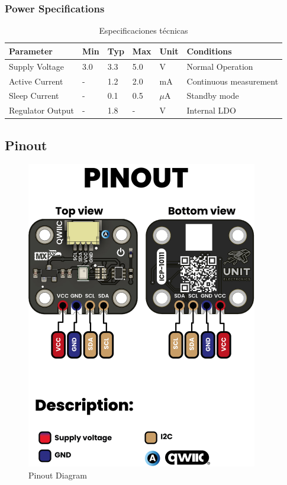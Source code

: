 \documentclass[11pt,a4paper]{article}
\begin{document}
\subsubsection{Power Specifications}


\begin{table}[H]
\centering
\small
\begin{tabular}{|l|l|l|l|l|l|}
\hline
Parameter & Min & Typ & Max & Unit & Conditions \\
\hline
Supply Voltage & 3.0 & 3.3 & 5.0 & V & Normal Operation \\
Active Current & - & 1.2 & 2.0 & mA & Continuous measurement \\
Sleep Current & - & 0.1 & 0.5 & $\mu$A & Standby mode \\
Regulator Output & - & 1.8 & - & V & Internal LDO \\
\hline
\end{tabular}
\caption{Especificaciones técnicas}
\end{table}


\subsection{Pinout}


\begin{figure}[H]
\centering
\includegraphics[width=0.9\textwidth]{en_unit_pinout_v_0_0_1_ue0094_icp10111_barometric_pressure_sensor_en.jpg}
\caption{Pinout Diagram}
\label{fig:en-unit-pinout-v-0-0-1-ue0094-icp10111-barometric-pressure-sensor-en-jpg}
\end{figure}
\end{document}
